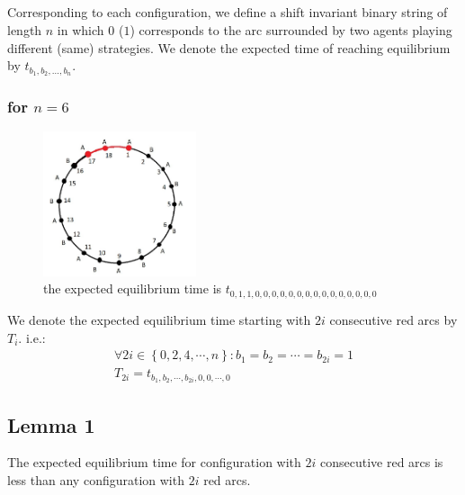 \documentclass[]{book}
\theoremstyle{definition}
\begin{document}
\subsection{}
Corresponding to each configuration, we define a shift invariant binary string of length $n$ in which $0$ ($1$) corresponds to the arc surrounded by two agents playing different (same)  strategies. We denote the expected time of reaching equilibrium by $t_{b_1, b_2, \hdots, b_n}$.
\subsubsection{for $n=6$}
\begin{figure}[H]
    \centering\includegraphics[width=0.4\textwidth]{figures/t0.jpg}
    \caption{the expected equilibrium time is $t_{0,1,1,0,0,0,0,0,0,0,0,0,0,0,0,0,0,0}$}
\end{figure}
We denote the expected equilibrium time starting with $2i$ consecutive red arcs by $T_i$. i.e.:
\begin{equation}
\begin{split}
    \forall 2i \in \left\{ 0, 2, 4, \cdots, n \right\}:b_1=b_2=\cdots=b_{2i}=1 \\ T_{2i} = t_{b_1, b_2, \cdots, b_{2i}, 0, 0, \cdots, 0}
\end{split}
\end{equation}

\subsection{Lemma 1}
The expected equilibrium time for configuration with $2i$ consecutive red arcs is less than any configuration with $2i$ red arcs.
\end{document}
